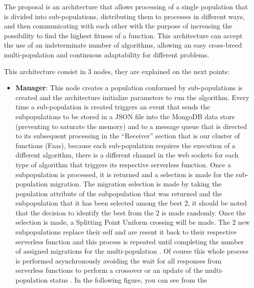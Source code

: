 \documentclass[runningheads]{llncs}
\begin{document}
The proposal is an architecture that allows processing of a single population
that is divided into sub-populations, distributing them to processes in different
ways, and then communicating with each other with the purpose of increasing the
possibility to find the highest fitness of a function. This architecture can accept
the use of an indeterminate number of algorithms, allowing an easy cross-breed multi-population 
and continuous adaptability for different problems. %

This architecture consist in 3 nodes, %
they are explained on the next points:

\begin{itemize}
  \item {\bf Manager}: This node creates a population conformed by sub-populations is created and the architecture
  initialize parameters to run the algorithm. Every time a sub-population is
  created triggers an event that sends the subpopulations to be stored in a 
  JSON file into the MongoDB data store (preventing to saturate the
  memory) %
  and to a message queue
  that is directed to its subsequent processing in the “Receiver” section that
  is our cluster of functions (Faas), because each sub-population requires the
  execution of a different algorithm, there is a different channel in the web
  sockets for each type of algorithm that triggers its respective serverless
  function. Once a subpopulation is processed, it is returned and a selection is
  made for the sub-population migration. The migration selection is made by
  taking the population attribute of the subpopulation that was returned and the
  subpopulation that it has been selected among the best 2, it should be noted
  that the decision to identify the best from the 2 is made randomly. Once the
  selection is made, a Splitting Point Uniform crossing will be made. The 2 new
  subpopulations replace their self and are resent it back to their respective
  serverless function and this process is repeated until completing the number
  of assigned migrations for the multi-population
  \cite{Ma2019,Santander-jim2018}. Of course this whole process is performed
  asynchronously avoiding the wait for all responses from serverless functions
  to perform a crossover or an update of the multi-population status
  \cite{Lovbjerg2001,Jimeno2019}. In the following figure, you can see from the

\end{itemize}
\end{document}
